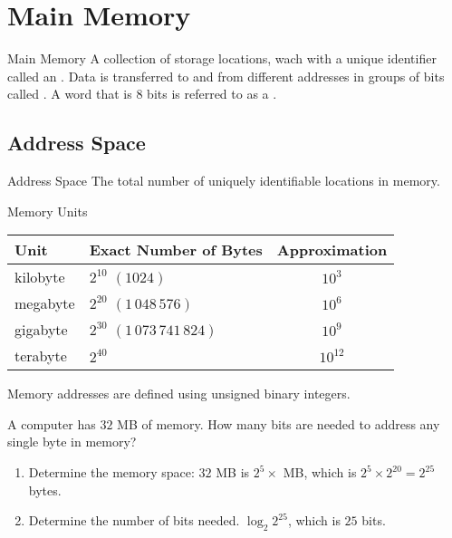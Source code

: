 \documentclass[../notes.tex]{subfiles}
\begin{document}
		\section{Main Memory}
			\begin{definition}{Main Memory}
				A collection of storage locations, wach with a unique identifier called an . Data is transferred to and from different addresses in groups of bits called . A word that is $8$ bits is referred to as a .
			\end{definition}
			\subsection{Address Space}
				\begin{definition}{Address Space}
					The total number of uniquely identifiable locations in memory.
				\end{definition}
				\begin{sidenote}{Memory Units}
					\begin{center}
						\begin{tabular}{llc}
							Unit & Exact Number of Bytes & Approximation\\
							\midrule
							kilobyte & $2^{10}$ $(1024)$ & $10^{3}$\\
							megabyte & $2^{20}$ $(1\,048\,576)$ & $10^{6}$\\
							gigabyte & $2^{30}$ $(1\,073\,741\,824)$ & $10^{9}$\\
							terabyte & $2^{40}$ & $10^{12}$
						\end{tabular}
					\end{center}
				\end{sidenote}
				Memory addresses are defined using unsigned binary integers.
				\begin{example}
					A computer has $32$ MB of memory. How many bits are needed to address any single byte in memory?
					\begin{enumerate}[nosep]
						\item Determine the memory space: $32$ MB is $2^{5} \times$ MB, which is $2^{5} \times 2^{20} = 2^{25}$ bytes.
						\item Determine the number of bits needed. $\log_{2}2^{25}$, which is $25$ bits.
					\end{enumerate}
				\end{example}
\end{document}
